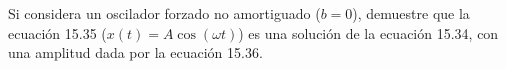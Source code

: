 \item Si considera un oscilador forzado no amortiguado ($b = 0$), demuestre que la ecuación 15.35 ($x(t) = A \cos(\omega t)$) es una solución de la ecuación 15.34, con una amplitud dada por la ecuación 15.36.